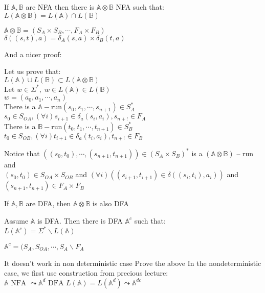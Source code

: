 \thm{}
{
    If $\mathbb{A}, \mathbb{B}$ are NFA then there is $\mathbb{A} \otimes \mathbb{B}$ NFA such that:\\
$L(\mathbb{A} \otimes \mathbb{B}) = L(\mathbb{A}) \cap L(\mathbb{B})$\\

    \begin{myproof}
        $\mathbb{A} \otimes \mathbb{B} = (S_A \times S_B,\cdots ,F_A \times F_B )$\\
$ \delta((s,t),a) = \delta_A(s,a)\times \delta_B(t,a)$
    \end{myproof}
    And a nicer proof:
    \begin{myproof}
        Let us prove that:\\
         $L(\mathbb{A}) \cup L(\mathbb{B}) \subset L(\mathbb{A}\otimes \mathbb{B})$\\
         Let $w \in \Sigma^{*},\; w \in L(\mathbb{A})\in L(\mathbb{B})$ \\
         $w = (a_0,a_1,\cdots ,a_n)$\\
         There is a $\mathbb{A} - \text{run}(s_0,s_1,\cdots ,s_{n+1}) \in S_A^{*}$\\
         $s_0 \in S_{OA}, (\forall i ) s_{i+1}\in\delta_a(s_i,a_i), s_{n+!} \in F_A$\\
         There is a $\mathbb{B} - \text{run}(t_0,t_1,\cdots ,t_{n+1}) \in S_B^{*}$\\
         $t_0 \in S_{OB}, (\forall i ) t_{i+1}\in\delta_a(t_i,a_i), t_{n+!} \in F_B$
    \end{myproof}
    \nt
    {
        Notice that $((s_0,t_0),\cdots ,(s_{n+1},t_{n+1}))\in(S_A \times S_B)^{*}$ is a $(\mathbb{A} \otimes \mathbb{B})$ -- run and\\
        $(s_0,t_0) \in S_{OA} \times S_{OB}$ and $(\forall i)((s_{i+1},t_{i+1}) \in \delta((s_i,t_i),a_i)) $ and $(s_{n+1},t_{n+1}) \in F_A \times F_B$
    }
}

\nt
{
    If $\mathbb{A}, \mathbb{B}$ are DFA, then $\mathbb{A}\otimes \mathbb{B}$ is also DFA
}

\thm{}
{
    Assume $ \mathbb{A}$ is DFA. Then there is DFA $\mathbb{A}^{c}$ such that:\\
    $L(\mathbb{A}^{c}) = \Sigma^{*}\backslash L(\mathbb{A})$\\
    \begin{myproof}
        $\mathbb{A}^{c} = (S_A,S_{OA},\cdots , S_A\backslash F_A$
    \end{myproof}

    \nt
    {
        It doesn't work in non deterministic case
        \qs{}
        {Prove the above}
    }
    \nt
    {
        In the nondeterministic case, we first use construction from precious lecture:\\
        $\mathbb{A} \text{ NFA } \leadsto \mathbb{A}^{d} \text{ DFA } L(\mathbb{A}) = L(\mathbb{A}^{d}) \leadsto \mathbb{A}^{dc}$
    }
}

